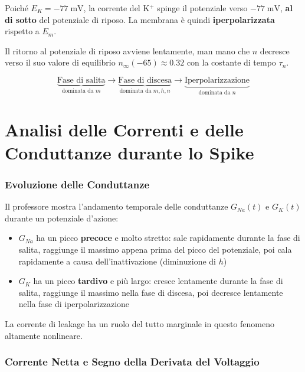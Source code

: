 Poiché $E_K = -77 \; \text{mV}$, la corrente del K$^+$ spinge il potenziale verso $-77 \; \text{mV}$, \textbf{al di sotto} del potenziale di riposo. La membrana è quindi \textbf{iperpolarizzata} rispetto a $E_m$.

Il ritorno al potenziale di riposo avviene lentamente, man mano che $n$ decresce verso il suo valore di equilibrio $n_\infty(-65) \approx 0.32$ con la costante di tempo $\tau_n$.

\begin{equation}
\underbrace{\text{Fase di salita}}_{\text{dominata da } m} \longrightarrow \underbrace{\text{Fase di discesa}}_{\text{dominata da } m, h, n} \longrightarrow \underbrace{\text{Iperpolarizzazione}}_{\text{dominata da } n}
\end{equation}


\section{Analisi delle Correnti e delle Conduttanze durante lo Spike}

\subsubsection{Evoluzione delle Conduttanze}

Il professore mostra l'andamento temporale delle conduttanze $G_{Na}(t) $ e $G_K(t)$ durante un potenziale d'azione:

\begin{itemize}
    \item $G_{Na}$ ha un picco \textbf{precoce} e molto stretto: sale rapidamente durante la fase di salita, raggiunge il massimo appena prima del picco del potenziale, poi cala rapidamente a causa dell'inattivazione (diminuzione di $h$)
    \item $G_K$ ha un picco \textbf{tardivo} e più largo: cresce lentamente durante la fase di salita, raggiunge il massimo nella fase di discesa, poi decresce lentamente nella fase di iperpolarizzazione
\end{itemize}

La corrente di leakage ha un ruolo del tutto marginale in questo fenomeno altamente nonlineare.

\subsubsection{Corrente Netta e Segno della Derivata del Voltaggio}


